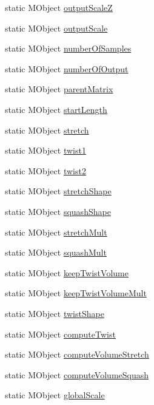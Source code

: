 \begin{DoxyCompactItemize}
\item 
static M\-Object \hyperlink{class_m_g__path_spine_a6708ed79d1460a01cffc3171889e1637}{output\-Scale\-Z}
\item 
static M\-Object \hyperlink{class_m_g__path_spine_a3c6c85e54a0a8f98f067df5884006717}{output\-Scale}
\item 
static M\-Object \hyperlink{class_m_g__path_spine_a1b03cd5d5735caea252ae5cc7f28a53c}{number\-Of\-Samples}
\item 
static M\-Object \hyperlink{class_m_g__path_spine_aed8434ed311d207b479f4418ca1bb432}{number\-Of\-Output}
\item 
static M\-Object \hyperlink{class_m_g__path_spine_a8eddab32708caeddc2c871d39e5d92fd}{parent\-Matrix}
\item 
static M\-Object \hyperlink{class_m_g__path_spine_a406a9df2d612bd346d3f7aac59646470}{start\-Length}
\item 
static M\-Object \hyperlink{class_m_g__path_spine_a56805052d8bd4e130c192b000b750efc}{stretch}
\item 
static M\-Object \hyperlink{class_m_g__path_spine_a3a8e37960ae8c40d2bf7cfe45ffcaaa6}{twist1}
\item 
static M\-Object \hyperlink{class_m_g__path_spine_a2558520e0fa84c73b1c52cfb9268ecab}{twist2}
\item 
static M\-Object \hyperlink{class_m_g__path_spine_a552a798b225b9aa4924e8d0d2c421843}{stretch\-Shape}
\item 
static M\-Object \hyperlink{class_m_g__path_spine_ab28430d046de80302091ba8be2c1ba8f}{squash\-Shape}
\item 
static M\-Object \hyperlink{class_m_g__path_spine_acfb6a9d96aadcc5630153819140993bb}{stretch\-Mult}
\item 
static M\-Object \hyperlink{class_m_g__path_spine_a9af9d259a81115c7fef275c67d54ccb1}{squash\-Mult}
\item 
static M\-Object \hyperlink{class_m_g__path_spine_a4c6cb4b1690e8704961a9e9a103c47a0}{keep\-Twist\-Volume}
\item 
static M\-Object \hyperlink{class_m_g__path_spine_adc3fed052e585c7b2f8345774c8e2d86}{keep\-Twist\-Volume\-Mult}
\item 
static M\-Object \hyperlink{class_m_g__path_spine_a89a8f6f283deb9da030ed711a78c1b3b}{twist\-Shape}
\item 
static M\-Object \hyperlink{class_m_g__path_spine_a61634d056e477a73db2a5c5bcfacec0a}{compute\-Twist}
\item 
static M\-Object \hyperlink{class_m_g__path_spine_ae23dd8337d46df00656630b0461c28df}{compute\-Volume\-Stretch}
\item 
static M\-Object \hyperlink{class_m_g__path_spine_a388952b4b3257d4ba2c7becb63a60061}{compute\-Volume\-Squash}
\item 
static M\-Object \hyperlink{class_m_g__path_spine_a2b442386812642012d95aecacc5939c1}{global\-Scale}
\end{DoxyCompactItemize}


